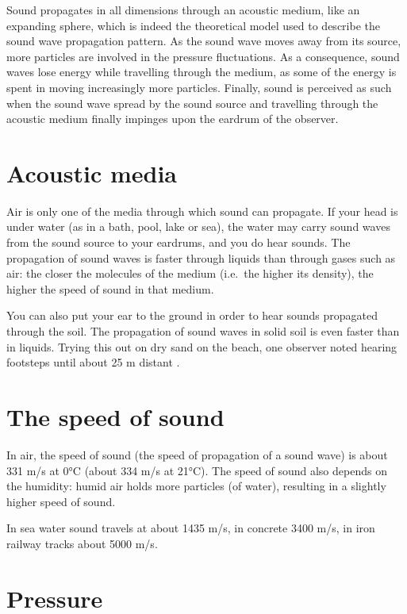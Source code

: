 \documentclass[
]{book}
\begin{document}
Sound propagates in all dimensions through an acoustic medium, like an expanding sphere, which is indeed the theoretical model used to describe the sound wave propagation pattern. As the sound wave moves away from its source, more particles are involved in the pressure fluctuations. As a consequence, sound waves lose energy while travelling through the medium, as some of the energy is spent in moving increasingly more particles. Finally, sound is perceived as such when the sound wave spread by the sound source and travelling through the acoustic medium finally impinges upon the eardrum of the observer.

\section{Acoustic media}\label{acoustic-media}

Air is only one of the media through which sound can propagate. If your head is under water (as in a bath, pool, lake or sea), the water may carry sound waves from the sound source to your eardrums, and you do hear sounds. The propagation of sound waves is faster through liquids than through gases such as air: the closer the molecules of the medium (i.e.~the higher its density), the higher the speed of sound in that medium.

You can also put your ear to the ground in order to hear sounds propagated through the soil. The propagation of sound waves in solid soil is even faster than in liquids. Trying this out on dry sand on the beach, one observer noted hearing footsteps until about 25 m distant \citep[§10]{Minnaert_1970v2}.

\section{The speed of sound}\label{sec-speedofsound}

In air, the speed of sound (the speed of propagation of a sound wave) is about 331 m/s at 0°C (about 334 m/s at 21°C). The speed of sound also depends on the humidity: humid air holds more particles (of water), resulting in a slightly higher speed of sound.

In sea water sound travels at about 1435 m/s, in concrete 3400 m/s, in iron railway tracks about 5000 m/s.

\section{Pressure}\label{pressure}
\end{document}
